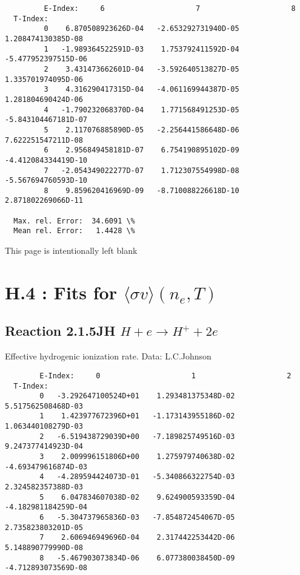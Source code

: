 \documentclass[12pt,dvipdfmx]{article}
\begin{document}
{\begin{small}
\begin{verbatim}
         E-Index:     6                     7                     8
  T-Index:
         0    6.870508923626D-04   -2.653292731940D-05    1.208474130385D-08
         1   -1.989364522591D-03    1.753792411592D-04   -5.477952397515D-06
         2    3.431473662601D-04   -3.592640513827D-05    1.335701974095D-06
         3    4.316290417315D-04   -4.061169944387D-05    1.281804690424D-06
         4   -1.790232068370D-04    1.771568491253D-05   -5.843104467181D-07
         5    2.117076885890D-05   -2.256441586648D-06    7.622251547211D-08
         6    2.956849458181D-07    6.754190895102D-09   -4.412084334419D-10
         7   -2.054349022277D-07    1.712307554998D-08   -5.567694760593D-10
         8    9.859620416969D-09   -8.710088226618D-10    2.871802269066D-11

  Max. rel. Error:  34.6091 \%
  Mean rel. Error:   1.4428 \%
\end{verbatim}\end{small}

\newpage
This page is intentionally left blank
\newpage


\section{H.4 :  Fits for $\langle\sigma v \rangle (n_e,T)$}\label{sect4}

\subsection{
Reaction 2.1.5JH   $H + e \rightarrow H^+ + 2e $}

   Effective hydrogenic ionization rate. Data: L.C.Johnson

\begin{small}\begin{verbatim}
        E-Index:     0                     1                     2
  T-Index:
        0   -3.292647100524D+01    1.293481375348D-02    5.517562508468D-03
        1    1.423977672396D+01   -1.173143955186D-02    1.063440108279D-03
        2   -6.519438729039D+00   -7.189825749516D-03    9.247377414923D-04
        3    2.009996151806D+00    1.275979740638D-02   -4.693479616874D-03
        4   -4.289594424073D-01   -5.340866322754D-03    2.324582357388D-03
        5    6.047834607038D-02    9.624900593359D-04   -4.182981184259D-04
        6   -5.304737965836D-03   -7.854872454067D-05    2.735823803201D-05
        7    2.606946949696D-04    2.317442253442D-06    5.148890779990D-08
        8   -5.467903073834D-06    6.077380038450D-09   -4.712893073569D-08


\end{verbatim}
\end{small}}
\end{document}
